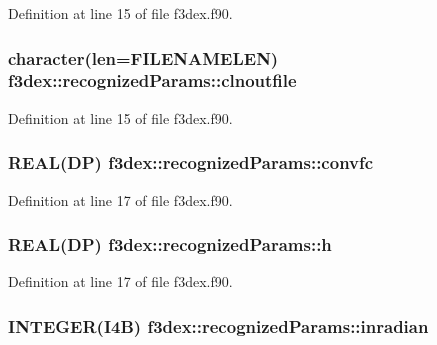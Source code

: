 Definition at line 15 of file f3dex.f90.

\hypertarget{typef3dex_1_1recognized_params_a3f299fef8aa9927191c98b106425eba2}{
\subsubsection[{clnoutfile}]{\setlength{\rightskip}{0pt plus 5cm}character(len=FILENAMELEN) {\bf f3dex::recognizedParams::clnoutfile}}}
\label{typef3dex_1_1recognized_params_a3f299fef8aa9927191c98b106425eba2}


Definition at line 15 of file f3dex.f90.

\hypertarget{typef3dex_1_1recognized_params_a52a0bba6487dc7381b20e2287a14e74b}{
\subsubsection[{convfc}]{\setlength{\rightskip}{0pt plus 5cm}REAL(DP) {\bf f3dex::recognizedParams::convfc}}}
\label{typef3dex_1_1recognized_params_a52a0bba6487dc7381b20e2287a14e74b}


Definition at line 17 of file f3dex.f90.

\hypertarget{typef3dex_1_1recognized_params_a48d5955018291fe9ab81fe416f69fa12}{
\subsubsection[{h}]{\setlength{\rightskip}{0pt plus 5cm}REAL(DP) {\bf f3dex::recognizedParams::h}}}
\label{typef3dex_1_1recognized_params_a48d5955018291fe9ab81fe416f69fa12}


Definition at line 17 of file f3dex.f90.

\hypertarget{typef3dex_1_1recognized_params_a99bf83fd9a59b48da7fe58f482dac3ba}{
\subsubsection[{inradian}]{\setlength{\rightskip}{0pt plus 5cm}INTEGER(I4B) {\bf f3dex::recognizedParams::inradian}}}
\label{typef3dex_1_1recognized_params_a99bf83fd9a59b48da7fe58f482dac3ba}


